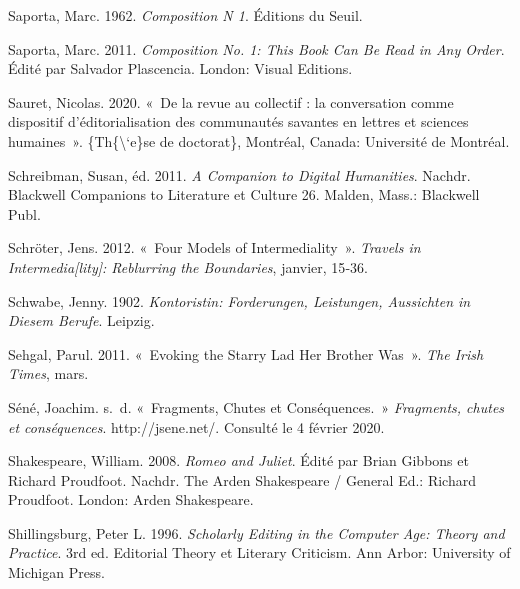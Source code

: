 \begin{CSLReferences}{1}{0}
\leavevmode{}%
Saporta, Marc. 1962. \emph{Composition N{\textdegree} 1}. {{É}ditions du
Seuil}.

\leavevmode{}%
Saporta, Marc. 2011. \emph{Composition No. 1: {This Book Can Be Read} in
{Any Order}}. Édité par Salvador Plascencia. {London}: {Visual
Editions}.

\leavevmode{}%
Sauret, Nicolas. 2020. {«~{De la revue au collectif : la conversation
comme dispositif d'{é}ditorialisation des communaut{é}s savantes en
lettres et sciences humaines}~»}. \{Th\{\textbackslash`e\}se de
doctorat\}, {Montr{é}al, Canada}: Universit{é} de Montr{é}al.

\leavevmode{}%
Schreibman, Susan, éd. 2011. \emph{A {Companion} to {Digital
Humanities}}. Nachdr. Blackwell Companions to Literature et Culture 26.
{Malden, Mass.}: {Blackwell Publ}.

\leavevmode{}%
Schröter, Jens. 2012. {«~Four {Models} of {Intermediality}~»}.
\emph{Travels in Intermedia{[}lity{]}: Reblurring the Boundaries},
janvier, 15‑36.

\leavevmode{}%
Schwabe, Jenny. 1902. \emph{Kontoristin: {Forderungen}, {Leistungen},
{Aussichten} in Diesem {Berufe}}. {Leipzig}.

\leavevmode{}%
Sehgal, Parul. 2011. {«~Evoking the {Starry Lad Her Brother Was}~»}.
\emph{The Irish Times}, mars.

\leavevmode{}%
Séné, Joachim. s.~d. {«~Fragments, Chutes et Cons{é}quences.~»}
\emph{Fragments, chutes et cons{é}quences}. http://jsene.net/. Consulté
le 4 février 2020.

\leavevmode{}%
Shakespeare, William. 2008. \emph{Romeo and {Juliet}}. Édité par Brian
Gibbons et Richard Proudfoot. Nachdr. The {Arden Shakespeare} / General
Ed.: {Richard Proudfoot}. {London}: {Arden Shakespeare}.

\leavevmode{}%
Shillingsburg, Peter L. 1996. \emph{Scholarly {Editing} in the {Computer
Age}: {Theory} and {Practice}}. 3rd ed. Editorial Theory et Literary
Criticism. {Ann Arbor}: {University of Michigan Press}.


\end{CSLReferences}
